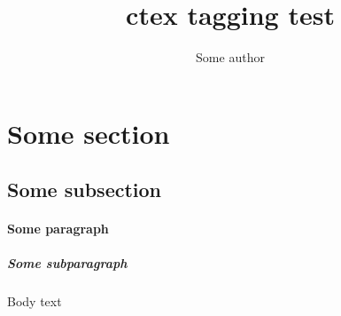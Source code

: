 \documentclass[fontset=fandol]{ctexart}
\title{ctex tagging test}
\author{Some author}
\begin{document}
\maketitle
\tableofcontents
\section{Some section}
\subsection{Some subsection}
\paragraph{Some paragraph}
\subparagraph{Some subparagraph}
Body text

\CTeX
\end{document}
